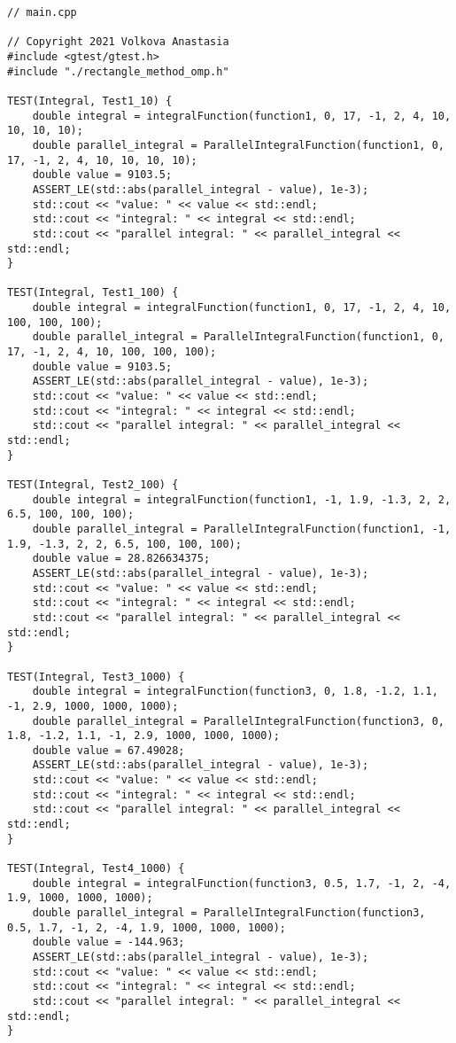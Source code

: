 \documentclass{report}
\begin{document}
\begin{lstlisting}
// main.cpp

// Copyright 2021 Volkova Anastasia
#include <gtest/gtest.h>
#include "./rectangle_method_omp.h"

TEST(Integral, Test1_10) {
    double integral = integralFunction(function1, 0, 17, -1, 2, 4, 10, 10, 10, 10);
    double parallel_integral = ParallelIntegralFunction(function1, 0, 17, -1, 2, 4, 10, 10, 10, 10);
    double value = 9103.5;
    ASSERT_LE(std::abs(parallel_integral - value), 1e-3);
    std::cout << "value: " << value << std::endl;
    std::cout << "integral: " << integral << std::endl;
    std::cout << "parallel integral: " << parallel_integral << std::endl;
}

TEST(Integral, Test1_100) {
    double integral = integralFunction(function1, 0, 17, -1, 2, 4, 10, 100, 100, 100);
    double parallel_integral = ParallelIntegralFunction(function1, 0, 17, -1, 2, 4, 10, 100, 100, 100);
    double value = 9103.5;
    ASSERT_LE(std::abs(parallel_integral - value), 1e-3);
    std::cout << "value: " << value << std::endl;
    std::cout << "integral: " << integral << std::endl;
    std::cout << "parallel integral: " << parallel_integral << std::endl;
}

TEST(Integral, Test2_100) {
    double integral = integralFunction(function1, -1, 1.9, -1.3, 2, 2, 6.5, 100, 100, 100);
    double parallel_integral = ParallelIntegralFunction(function1, -1, 1.9, -1.3, 2, 2, 6.5, 100, 100, 100);
    double value = 28.826634375;
    ASSERT_LE(std::abs(parallel_integral - value), 1e-3);
    std::cout << "value: " << value << std::endl;
    std::cout << "integral: " << integral << std::endl;
    std::cout << "parallel integral: " << parallel_integral << std::endl;
}

TEST(Integral, Test3_1000) {
    double integral = integralFunction(function3, 0, 1.8, -1.2, 1.1, -1, 2.9, 1000, 1000, 1000);
    double parallel_integral = ParallelIntegralFunction(function3, 0, 1.8, -1.2, 1.1, -1, 2.9, 1000, 1000, 1000);
    double value = 67.49028;
    ASSERT_LE(std::abs(parallel_integral - value), 1e-3);
    std::cout << "value: " << value << std::endl;
    std::cout << "integral: " << integral << std::endl;
    std::cout << "parallel integral: " << parallel_integral << std::endl;
}

TEST(Integral, Test4_1000) {
    double integral = integralFunction(function3, 0.5, 1.7, -1, 2, -4, 1.9, 1000, 1000, 1000);
    double parallel_integral = ParallelIntegralFunction(function3, 0.5, 1.7, -1, 2, -4, 1.9, 1000, 1000, 1000);
    double value = -144.963;
    ASSERT_LE(std::abs(parallel_integral - value), 1e-3);
    std::cout << "value: " << value << std::endl;
    std::cout << "integral: " << integral << std::endl;
    std::cout << "parallel integral: " << parallel_integral << std::endl;
}


\end{lstlisting}
\end{document}
